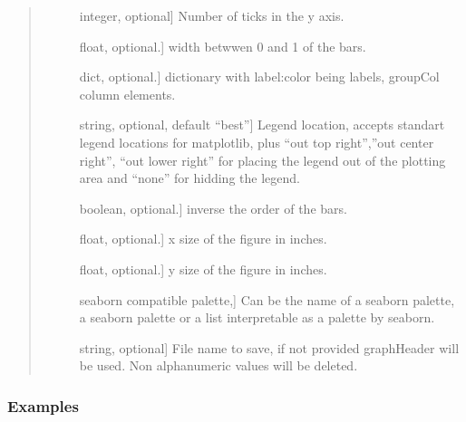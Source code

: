 \documentclass[letterpaper,10pt,english]{sphinxmanual}
\begin{document}
\begin{fulllineitems}
\begin{quote}
\begin{description}
\begin{description}
\item[{}] \leavevmode{[}integer, optional{]}
Number of ticks in the y axis.

\item[{}] \leavevmode{[}float, optional.{]}
width betwwen 0 and 1 of the bars.

\item[{}] \leavevmode{[}dict, optional.{]}
dictionary with label:color being labels, 
groupCol column elements.

\item[{}] \leavevmode{[}string, optional, default “best”{]}
Legend location, accepts standart legend locations 
for matplotlib, plus “out top right”,”out center right”, 
“out lower right” for placing the legend out of 
the plotting area and “none” for hidding the legend.

\item[{}] \leavevmode{[}boolean, optional.{]}
inverse the order of the bars.

\item[{}] \leavevmode{[}float, optional.{]}
x size of the figure in inches.

\item[{}] \leavevmode{[}float, optional.{]}
y size of the figure in inches.

\item[{}] \leavevmode{[}seaborn compatible palette,{]}
Can be the name of a seaborn palette, 
a seaborn palette or a list 
interpretable as a palette by seaborn.

\item[{}] \leavevmode{[}string, optional{]}
File name to save, if not provided graphHeader will be used. 
Non alphanumeric values will be deleted.

\end{description}

\end{description}\end{quote}
\subsubsection*{Examples}


\end{fulllineitems}
\end{document}
